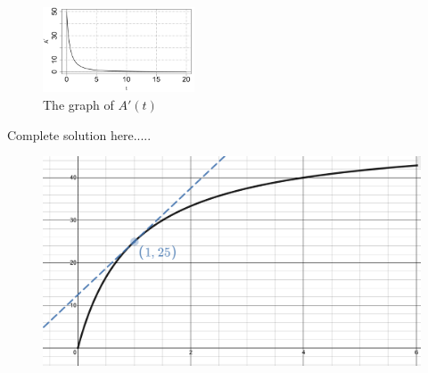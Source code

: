 \begin{example}
\begin{sol}
    \begin{figure}[h]
 \centering
    \includegraphics[width=0.4\textwidth]{images/productQuotient/AprimeFunction.png}
    \caption{The graph of $A'(t)$}
    \label{fig:AprimeFunction}
    \end{figure}
    \end{sol}
    \begin{solL}
    Complete solution here.....
    
    \end{solL}
    
\end{example}
\newpage
 \begin{figure}[h!]
 \centering
    \includegraphics[scale=0.225]{images/productQuotient/11_6a.png}
    \caption{}
    \end{figure}
    
